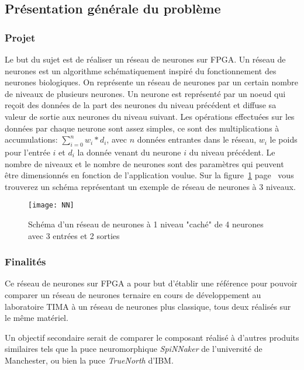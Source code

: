 
\subsection{Présentation générale du problème}

\subsubsection{Projet}
Le but du sujet est de réaliser un réseau de neurones sur FPGA. Un réseau de neurones est un algorithme schématiquement inspiré du fonctionnement des neurones biologiques.
On représente un réseau de neurones par un certain nombre de niveaux de plusieurs neurones.
Un neurone est représenté par un noeud qui reçoit des données de la part des neurones du niveau précédent et diffuse sa valeur de sortie aux neurones du niveau suivant.
Les opérations effectuées sur les données par chaque neurone sont assez simples, ce sont des multiplications à accumulations:  $\sum_{i=0}^n w_{i}*d_{i}$, avec $n$ données
entrantes dans le réseau, $w_{i}$ le poids pour l'entrée $i$ et $d_{i}$ la donnée venant du neurone $i$ du niveau précédent.
Le nombre de niveaux et le nombre de neurones sont des paramètres qui peuvent être dimensionnés en fonction de l'application voulue.
Sur la figure~\ref{fig:NN} page~\pageref{fig:NN} vous trouverez un schéma représentant un exemple de réseau de neurones à 3 niveaux.

\begin{figure}[htbp]
\begin{center}
\texttt{[image: NN]}
\caption{Schéma d'un réseau de neurones à 1 niveau "caché" de 4 neurones avec 3 entrées et 2 sorties}
\label{fig:NN}
\end{center}
\end{figure}

\subsubsection{Finalités}

Ce réseau de neurones sur FPGA a pour but d'établir une référence pour pouvoir
comparer un réseau de neurones ternaire en cours de développement au laboratoire
TIMA à un réseau de neurones plus classique, tous deux réalisés sur le même
matériel.

Un objectif secondaire serait de comparer le composant réalisé à d'autres
produits similaires tels que la puce neuromorphique {\em SpiNNaker}\cite{painkras2013spinnaker} de l'université
de Manchester, ou bien la puce {\em TrueNorth}\cite{modha2014introducing} d'IBM.

